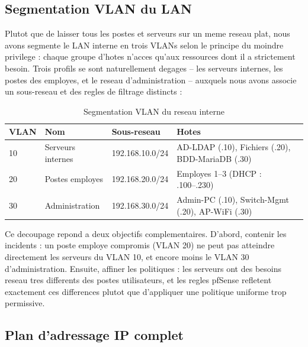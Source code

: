 \documentclass[11pt,a4paper]{article}
\begin{document}
\subsection{Segmentation VLAN du LAN}

Plutot que de laisser tous les postes et serveurs sur un meme reseau plat, nous avons segmente le LAN interne en trois VLANs selon le principe du moindre privilege : chaque groupe d'hotes n'acces qu'aux ressources dont il a strictement besoin. Trois profils se sont naturellement degages -- les serveurs internes, les postes des employes, et le reseau d'administration -- auxquels nous avons associe un sous-reseau et des regles de filtrage distincts :

\begin{table}[H]
\centering
\begin{tabular}{@{}lllp{6cm}@{}}
\toprule
\textbf{VLAN} & \textbf{Nom} & \textbf{Sous-reseau} & \textbf{Hotes} \\
\midrule
10 & Serveurs internes & 192.168.10.0/24 & AD-LDAP (.10), Fichiers (.20), BDD-MariaDB (.30) \\
20 & Postes employes  & 192.168.20.0/24 & Employes 1--3 (DHCP : .100--.230) \\
30 & Administration   & 192.168.30.0/24 & Admin-PC (.10), Switch-Mgmt (.20), AP-WiFi (.30) \\
\bottomrule
\end{tabular}
\caption{Segmentation VLAN du reseau interne}
\label{tab:vlans}
\end{table}

Ce decoupage repond a deux objectifs complementaires. D'abord, contenir les incidents : un poste employe compromis (VLAN 20) ne peut pas atteindre directement les serveurs du VLAN 10, et encore moins le VLAN 30 d'administration. Ensuite, affiner les politiques : les serveurs ont des besoins reseau tres differents des postes utilisateurs, et les regles pfSense refletent exactement ces differences plutot que d'appliquer une politique uniforme trop permissive.

\subsection{Plan d'adressage IP complet}
\end{document}
